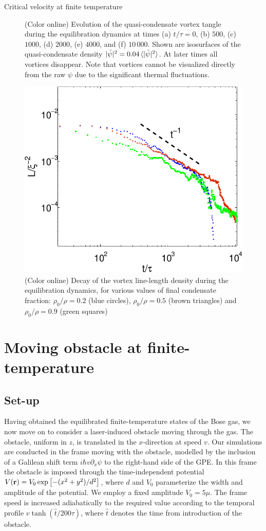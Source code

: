 \begin{chapter}{\label{cha:nonequib}Critical velocity at finite temperature}
\begin{figure}
    \caption{(Color online) Evolution of the quasi-condensate vortex tangle during the equilibration dynamics at times (a) $t/\tau=0$, (b) $500$, (c) $1000$, (d) $2000$, (e) $4000$, and (f) $10\,000$.  Shown are isosurfaces of the quasi-condensate density $|\hat{\psi}|^2 = 0.04\braket{|\hat{\psi}|^2}$. At later times all vortices disappear.  Note that vortices cannot be visualized directly from the raw $\psi$ due to the significant thermal fluctuations.
}
    \label{fig:thermal}
\end{figure}


\begin{figure}
  \centering
    \includegraphics[width=0.45\linewidth]{nonequib/figures/ll_t_2}
    \caption{(Color online) 
Decay of the vortex line-length density during the equilibration dynamics, for various values of final condensate fraction:  $\rho_0/\rho = 0.2$ (blue circles), $\rho_0/\rho = 0.5$ (brown triangles) and $\rho_0/\rho = 0.9$ (green squares)
}
    \label{fig:ll_t}
\end{figure}




  \section{Moving obstacle at finite-temperature\label{sec:obstacle}}
\subsection{Set-up}
Having obtained the equilibrated finite-temperature states of the Bose gas, we now move on to consider a laser-induced obstacle moving through the gas.  The obstacle, uniform in $z$, is translated in the $x$-direction at speed $v$.  Our simulations are conducted in the frame moving with the obstacle, modelled by the inclusion of a Galilean shift term $i \hbar v \partial_x \psi$ to the right-hand side of the GPE.  In this frame the obstacle is imposed through the time-independent potential $V{(\bf r})=V_0 \exp\left[{-(x^2+y^2)/d^2 }\right]$, where $d$ and $V_0$ parameterize the width and amplitude of the potential.  We employ a fixed amplitude $V_0=5\mu$.   The frame speed is increased adiabatically to the required value according to the temporal profile $v \tanh(\hat{t}/200 \tau)$, where $\hat{t}$ denotes the time from introduction of the obstacle.


\end{chapter}
